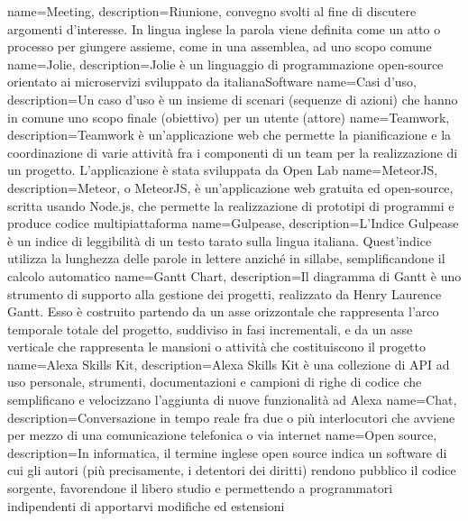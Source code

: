  {
	name=Meeting,
	description={Riunione, convegno svolti al fine di discutere argomenti d'interesse. In lingua inglese la parola viene definita come un atto o processo per giungere assieme, come in una assemblea, ad uno scopo comune}
}
 {
	name=Jolie,
	description={Jolie è un linguaggio di programmazione open-source orientato ai microservizi sviluppato da italianaSoftware}
}
 {
	name=Casi d'uso,
	description={Un caso d'uso è un insieme di scenari (sequenze di azioni) che hanno in comune uno scopo finale (obiettivo) per un utente (attore)}
}
 {
	name=Teamwork,
	description={Teamwork è un'applicazione web che permette la pianificazione e la coordinazione di varie attività fra i componenti di un team per la realizzazione di un progetto. L'applicazione è stata sviluppata da Open Lab}
}
 {
	name=MeteorJS,
	description={Meteor, o MeteorJS, è un'applicazione web gratuita ed open-source, scritta usando Node.js, che permette la realizzazione di prototipi di programmi e produce codice multipiattaforma}
}
 {
	name=Gulpease,
	description={L'Indice Gulpease è un indice di leggibilità di un testo tarato sulla lingua italiana. Quest'indice utilizza la lunghezza delle parole in lettere anziché in sillabe, semplificandone il calcolo automatico}
}
 {
	name=Gantt Chart,
	description={Il diagramma di Gantt è uno strumento di supporto alla gestione dei progetti, realizzato da Henry Laurence Gantt. Esso è costruito partendo da un asse orizzontale che rappresenta l'arco temporale totale del progetto, suddiviso in fasi incrementali, e da un asse verticale che rappresenta le mansioni o attività che costituiscono il progetto}
}
 {
	name=Alexa Skills Kit,
	description={Alexa Skills Kit è una collezione di API ad uso personale, strumenti, documentazioni e campioni di righe di codice che semplificano e velocizzano l'aggiunta di nuove funzionalità ad Alexa}
}
 {
	name=Chat,
	description={Conversazione in tempo reale fra due o più interlocutori che avviene per mezzo di una comunicazione telefonica o via internet}
}
 {
	name=Open source,
	description={In informatica, il termine inglese open source indica un software di cui gli autori (più precisamente, i detentori dei diritti) rendono pubblico il codice sorgente, favorendone il libero studio e permettendo a programmatori indipendenti di apportarvi modifiche ed estensioni}
}

